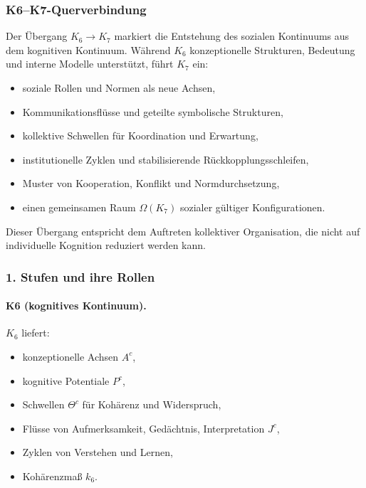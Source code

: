 
\subsubsection{K6–K7-Querverbindung}
\label{sec:crossk-k6-k7}

Der Übergang $K_6 \rightarrow K_7$ markiert die Entstehung des sozialen
Kontinuums aus dem kognitiven Kontinuum. Während $K_6$ konzeptionelle Strukturen,
Bedeutung und interne Modelle unterstützt, führt $K_7$ ein:
\begin{itemize}
  \item soziale Rollen und Normen als neue Achsen,
  \item Kommunikationsflüsse und geteilte symbolische Strukturen,
  \item kollektive Schwellen für Koordination und Erwartung,
  \item institutionelle Zyklen und stabilisierende Rückkopplungsschleifen,
  \item Muster von Kooperation, Konflikt und Normdurchsetzung,
  \item einen gemeinsamen Raum $\Omega(K_7)$ sozialer gültiger Konfigurationen.
\end{itemize}

Dieser Übergang entspricht dem Auftreten kollektiver Organisation, die nicht auf
individuelle Kognition reduziert werden kann.

\subsubsection{1. Stufen und ihre Rollen}

\paragraph{K6 (kognitives Kontinuum).}
$K_6$ liefert:
\begin{itemize}
  \item konzeptionelle Achsen $A^{c}$,
  \item kognitive Potentiale $P^{c}$,
  \item Schwellen $\Theta^{c}$ für Kohärenz und Widerspruch,
  \item Flüsse von Aufmerksamkeit, Gedächtnis, Interpretation $J^{c}$,
  \item Zyklen von Verstehen und Lernen,
  \item Kohärenzmaß $k_6$.
\end{itemize}

